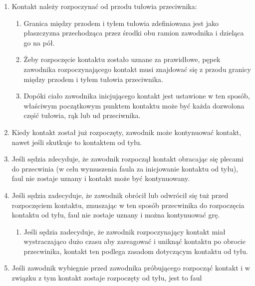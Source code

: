 \documentclass[12pt]{article}
\begin{document}
\begin{enumerate}
	\item
	      Kontakt należy rozpoczynać od przodu tułowia przeciwnika:

	      \begin{enumerate}
		      \item
		            Granica między przodem i tyłem tułowia zdefiniowana jest jako
		            płaszczyzna przechodząca przez środki obu ramion zawodnika i
		            dzieląca go na pół.
		      \item
		            Żeby rozpoczęcie kontaktu zostało uznane za prawidłowe, pępek
		            zawodnika rozpoczynającego kontakt musi znajdować się z przodu
		            granicy między przodem i tyłem tułowia przeciwnika.
		      \item
		            Dopóki ciało zawodnika inicjującego kontakt jest ustawione w ten
		            sposób, właściwym początkowym punktem kontaktu może być każda
		            dozwolona część tułowia, rąk lub ud przeciwnika.
	      \end{enumerate}
	\item
	      Kiedy kontakt został już rozpoczęty, zawodnik może kontynuować
	      kontakt, nawet jeśli skutkuje to kontaktem od tyłu.
	\item
	      Jeśli sędzia zdecyduje, że zawodnik rozpoczął kontakt obracając się
	      plecami do przecwinia (w celu wymuszenia faula za inicjowanie kontaktu
	      od tyłu), faul nie zostaje uznany i kontakt może być kontynuowany.
	\item
	      Jeśli sędzia zadecyduje, że zawodnik obrócił lub odwrócił się tuż
	      przed rozpoczęciem kontaktu, zmuszając w ten sposób przecwinika do
	      rozpoczęcia kontaktu od tyłu, faul nie zostaje uznany i można
	      kontynuować grę.

	      \begin{enumerate}
		      \item
		            Jeśli sędzia zadecyduje, że zawodnik rozpoczynający kontakt miał
		            wystraczająco dużo czasu aby zareagować i uniknąć kontaktu po
		            obrocie przecwinika, kontakt ten podlega zasadom dotyczącym kontaktu
		            od tyłu.
	      \end{enumerate}
	\item
	      Jeśli zawodnik wybiegnie przed zawodnika próbującego rozpocząć kontakt
	      i w związku z tym kontakt zostaje rozpoczęty od tyłu, jest to faul
\end{enumerate}
\end{document}
